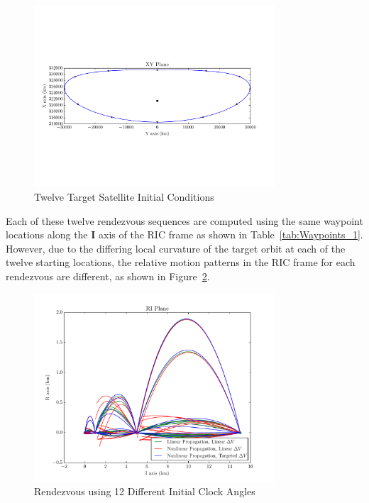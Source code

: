 \documentclass[letterpaper, preprint, paper,11pt]{AAS}	%
\begin{document}
\begin{figure}[h] 
	\begin{center}
		\includegraphics[width=0.8\textwidth]{Target_Full_Orbit_2}
		\caption{Twelve Target Satellite Initial Conditions}
		\label{fig:FullOrbit_2}
	\end{center}
\end{figure}

Each of these twelve rendezvous sequences are computed using the same waypoint locations along the \(\mathbf{I}\) axis of the RIC frame as shown in Table~\ref{tab:Waypoints_1}.  However, due to the differing local curvature of the target orbit at each of the twelve starting locations, the relative motion patterns in the RIC frame for each rendezvous are different, as shown in Figure~\ref{fig:RIC_2}.  

\begin{figure}[h] 
	\begin{center}
		\includegraphics[width=0.8\textwidth]{RIC_2}
		\caption{Rendezvous using 12 Different Initial Clock Angles}
		\label{fig:RIC_2}
	\end{center}
\end{figure}
\end{document}

